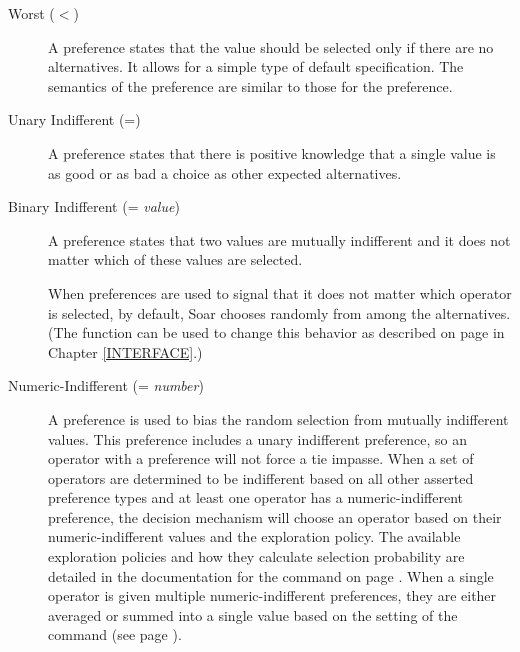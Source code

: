 \begin{description}
\item [Worst ($<$)] A  preference states that the value should be 
selected
        only if there are no alternatives.  It allows for a simple type of
        default specification. The semantics of the  preference
        are similar to those for the  preference.\vspace{-8pt}

\item [Unary Indifferent (=)] A  preference states that
		there is positive knowledge that a single value is as good or as bad a choice as
		other expected alternatives.
\item [Binary Indifferent (= \emph{value})] A  preference states 
		that two values are mutually indifferent and it does not matter which of these
		values are selected.
        
	When  preferences are used to signal that it does
	not matter which operator is selected, by default, Soar
	chooses randomly from among the alternatives. (The
	 function can be used to change this
	behavior as described on
	page \pageref{decide-indifferent-selection} in Chapter
	\ref{INTERFACE}.)\vspace{-8pt}

\item [Numeric-Indifferent (= \emph{number})]
	A  preference is used to bias the random selection
	from mutually indifferent values. This preference includes a unary
	indifferent preference, so an operator with a 
	preference will not force a tie impasse. When a set of operators are
	determined to be indifferent based on all other asserted preference types
	and at least one operator has a numeric-indifferent preference, the decision
	mechanism will choose an operator based on their numeric-indifferent values
	and the exploration policy. The available exploration policies and how they
	calculate selection probability are detailed in the documentation for the
	 command on page
	\pageref{decide-indifferent-selection}. When a single operator is given multiple
	numeric-indifferent preferences, they are either averaged or summed into a
	single value based on the setting of the 
	command (see page \pageref{decide-numeric-indifferent-mode}).


\end{description}

